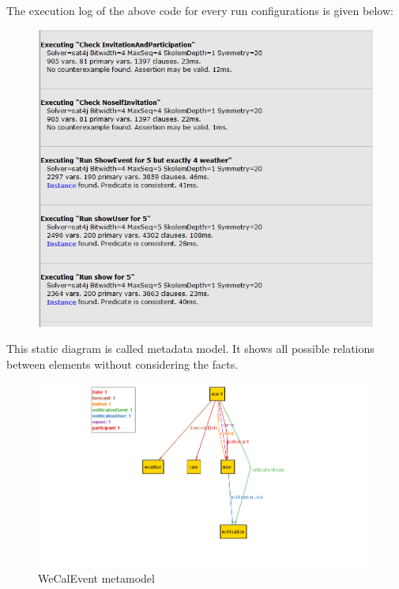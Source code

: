 \newpage
\qquad The execution log of the above code for every run configurations is given below:\newline
\begin{figure}[tbh]
 \begin{center}
  \includegraphics[width=180mm]{Alt2}
  \end{center}
\end{figure}
\newpage
\qquad This static diagram is called metadata model. It shows all possible relations between elements without considering the facts. 
\begin{figure}[tbh]
  \begin{center}
  \includegraphics[width=150mm]{metamodel}
    \caption{WeCalEvent metamodel}\label{Fig :}
  \end{center}
\end{figure}



